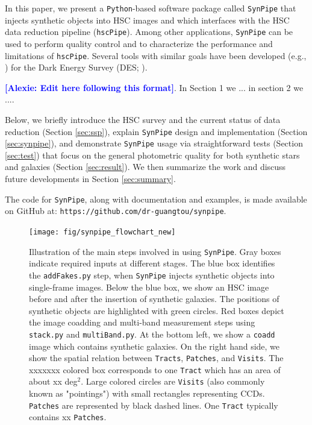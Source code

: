 \documentclass[useamsfonts]{pasj01}
\newcommand{\alexie}[1]{\textcolor{blue}{\textbf{[Alexie: #1]}}}
\def\hscpipe{\texttt{hscPipe}}
\def\synpipe{\texttt{SynPipe}}
\def\coadd{\texttt{coadd}}
\begin{document}
   In this paper, we present a \texttt{Python}-based software package called  \synpipe{} that  injects synthetic objects into  HSC images  and  which interfaces with the HSC data reduction pipeline (\hscpipe{}). Among other applications, \synpipe{} can be used to perform quality control and to characterize the performance and limitations of  \hscpipe{}. Several tools with similar goals have been developed (e.g., \citealt{Chang2015,
    Suchyta2016}) for the Dark Energy Survey (DES; \citealt{DES2005}).


 \alexie{Edit here following this format}. In Section 1 we ... in section 2 we ....
    
    Below, we briefly introduce the HSC survey and the current status of data
    reduction (Section \ref{sec:ssp}), explain \synpipe{} design and implementation
    (Section \ref{sec:synpipe}), and demonstrate \synpipe{} usage via straightforward
    tests (Section \ref{sec:test}) that focus on the general photometric quality for
    both synthetic stars and galaxies (Section \ref{sec:result}).
    We then summarize the work and discuss future developments in
    Section \ref{sec:summary}.

    The code for \synpipe{}, along with documentation and examples, is made available
    on GitHub at: \texttt{https://github.com/dr-guangtou/synpipe}.
    

\begin{figure}
    \begin{center}
        \texttt{[image: fig/synpipe\_flowchart\_new]}
    \end{center}
    \caption{
        Illustration of the main steps involved in using \synpipe{}.
        Gray boxes indicate required inputs at different stages.
        The blue box identifies the \texttt{addFakes.py} step, when \synpipe{} injects synthetic objects into single-frame images. Below the blue box, we show an HSC image before and after the insertion of synthetic galaxies. The positions of synthetic  objects are highlighted with green circles. Red boxes depict the image coadding and multi-band measurement steps
        using \texttt{stack.py} and \texttt{multiBand.py}. At the bottom left, we show a \coadd{} image which contains synthetic galaxies. On the right hand side, we show the spatial relation
        between \texttt{Tracts}, \texttt{Patches}, and \texttt{Visits}. The xxxxxxx colored box corresponds to one \texttt{Tract} which has an area of about xx deg$^2$. Large colored circles are \texttt{Visits} (also commonly known as "pointings") with small rectangles representing CCDs. \texttt{Patches} are represented by black dashed lines. One \texttt{Tract} typically contains xx  \texttt{Patches}.}
    \label{fig:flowchart}
\end{figure}
\end{document}
